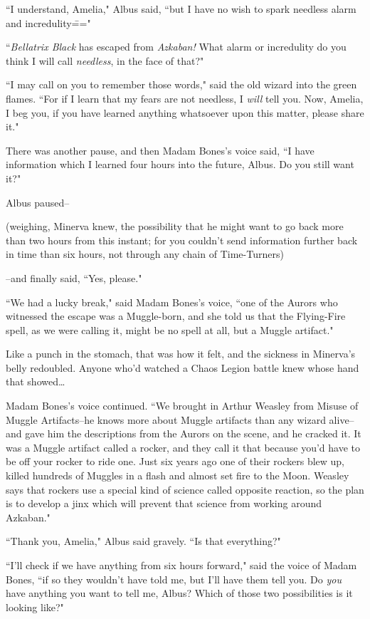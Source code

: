 ``I understand, Amelia," Albus said, ``but I have no wish to spark needless alarm and incredulity\==="

``\emph{Bellatrix Black} has escaped from \emph{Azkaban!} What alarm or incredulity do you think I will call \emph{needless}, in the face of that?"

``I may call on you to remember those words," said the old wizard into the green flames. ``For if I learn that my fears are not needless, I \emph{will} tell you. Now, Amelia, I beg you, if you have learned anything whatsoever upon this matter, please share it."

There was another pause, and then Madam Bones's voice said, ``I have information which I learned four hours into the future, Albus. Do you still want it?"

Albus paused\---

(weighing, Minerva knew, the possibility that he might want to go back more than two hours from this instant; for you couldn't send information further back in time than six hours, not through any chain of Time-Turners)

\---and finally said, ``Yes, please."

``We had a lucky break," said Madam Bones's voice, ``one of the Aurors who witnessed the escape was a Muggle-born, and she told us that the Flying-Fire spell, as we were calling it, might be no spell at all, but a Muggle artifact."

Like a punch in the stomach, that was how it felt, and the sickness in Minerva's belly redoubled. Anyone who'd watched a Chaos Legion battle knew whose hand that showed{\ldots}

Madam Bones's voice continued. ``We brought in Arthur Weasley from Misuse of Muggle Artifacts\---he knows more about Muggle artifacts than any wizard alive\---and gave him the descriptions from the Aurors on the scene, and he cracked it. It was a Muggle artifact called a rocker, and they call it that because you'd have to be off your rocker to ride one. Just six years ago one of their rockers blew up, killed hundreds of Muggles in a flash and almost set fire to the Moon. Weasley says that rockers use a special kind of science called opposite reaction, so the plan is to develop a jinx which will prevent that science from working around Azkaban."

``Thank you, Amelia," Albus said gravely. ``Is that everything?"

``I'll check if we have anything from six hours forward," said the voice of Madam Bones, ``if so they wouldn't have told me, but I'll have them tell you. Do \emph{you} have anything you want to tell me, Albus? Which of those two possibilities is it looking like?"

